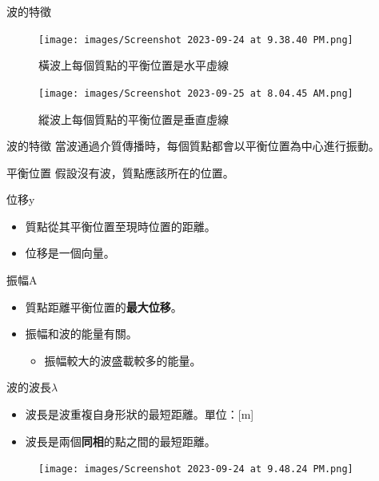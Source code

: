 \documentclass[13pt]{beamer}
\begin{document}
\begin{frame}{波的特徵}
    \begin{figure}
        \centering
        \texttt{[image: images/Screenshot 2023-09-24 at 9.38.40 PM.png]}
        \caption{橫波上每個質點的平衡位置是水平虛線}

    \end{figure}
    \begin{figure}
        \centering
        \texttt{[image: images/Screenshot 2023-09-25 at 8.04.45 AM.png]}
        \caption{縱波上每個質點的平衡位置是垂直虛線}

    \end{figure}

\end{frame}
\begin{frame}{波的特徵}
    當波通過介質傳播時，每個質點都會以平衡位置為中心進行振動。
    \begin{block}{平衡位置}
        假設沒有波，質點應該所在的位置。
    \end{block}
    \begin{block}{位移y}
        \begin{itemize}
            \item 質點從其平衡位置至現時位置的距離。
            \item 位移是一個向量。
        \end{itemize}
    \end{block}
    \begin{block}{振幅A}
        \begin{itemize}
            \item 質點距離平衡位置的\textbf{最大位移}。
            \item 振幅和波的能量有關。
                  \begin{itemize}
                      \item 振幅較大的波盛載較多的能量。
                  \end{itemize}
        \end{itemize}
    \end{block}
\end{frame}



\begin{frame}{波的波長$\lambda$}
    \begin{itemize}
        \item 波長是波重複自身形狀的最短距離。單位：[m]
        \item 波長是兩個\textbf{同相}的點之間的最短距離。
    \end{itemize}
    \begin{figure}
        \centering
        \texttt{[image: images/Screenshot 2023-09-24 at 9.48.24 PM.png]}


    \end{figure}
\end{frame}
\end{document}
